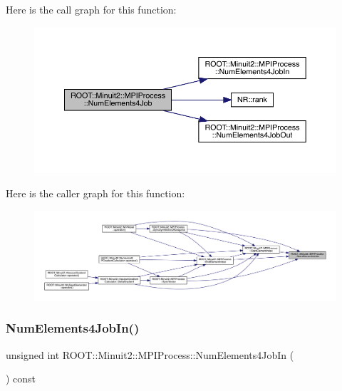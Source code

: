 Here is the call graph for this function\+:
\nopagebreak
\begin{figure}[H]
\begin{center}
\leavevmode
\includegraphics[width=350pt]{dc/d43/classROOT_1_1Minuit2_1_1MPIProcess_a9d9453545f311f9f9f995800ed518258_cgraph}
\end{center}
\end{figure}
Here is the caller graph for this function\+:
\nopagebreak
\begin{figure}[H]
\begin{center}
\leavevmode
\includegraphics[width=350pt]{dc/d43/classROOT_1_1Minuit2_1_1MPIProcess_a9d9453545f311f9f9f995800ed518258_icgraph}
\end{center}
\end{figure}
\mbox{\label{classROOT_1_1Minuit2_1_1MPIProcess_ada3f8f6f1b28844db6cb6bd717521ffd}} 
\subsubsection{\texorpdfstring{NumElements4JobIn()}{NumElements4JobIn()}\hspace{0.1cm}{\footnotesize\ttfamily [1/3]}}
{\footnotesize\ttfamily unsigned int R\+O\+O\+T\+::\+Minuit2\+::\+M\+P\+I\+Process\+::\+Num\+Elements4\+Job\+In (\begin{DoxyParamCaption}{ }\end{DoxyParamCaption}) const\hspace{0.3cm}{\ttfamily [inline]}}

